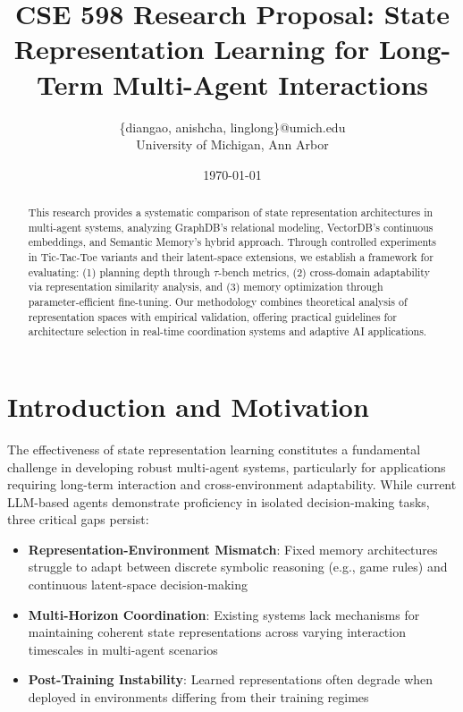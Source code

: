 \documentclass[11pt]{article}
\title{CSE 598 Research Proposal: State Representation Learning for Long-Term Multi-Agent Interactions}
\author{\{diangao, anishcha, linglong\}@umich.edu \\ University of Michigan, Ann Arbor}
\date{\today}
\begin{document}
\maketitle

\begin{abstract}
\noindent This research provides a systematic comparison of state representation architectures in multi-agent systems, analyzing GraphDB's relational modeling, VectorDB's continuous embeddings, and Semantic Memory's hybrid approach. Through controlled experiments in Tic-Tac-Toe variants and their latent-space extensions, we establish a framework for evaluating: (1) planning depth through $\tau$-bench metrics, (2) cross-domain adaptability via representation similarity analysis, and (3) memory optimization through parameter-efficient fine-tuning. Our methodology combines theoretical analysis of representation spaces with empirical validation, offering practical guidelines for architecture selection in real-time coordination systems and adaptive AI applications.
\end{abstract}

\section{Introduction and Motivation}
The effectiveness of state representation learning constitutes a fundamental challenge in developing robust multi-agent systems, particularly for applications requiring long-term interaction and cross-environment adaptability. While current LLM-based agents demonstrate proficiency in isolated decision-making tasks, three critical gaps persist:

\begin{itemize}
    \item \textbf{Representation-Environment Mismatch}: Fixed memory architectures struggle to adapt between discrete symbolic reasoning (e.g., game rules) and continuous latent-space decision-making
    
    \item \textbf{Multi-Horizon Coordination}: Existing systems lack mechanisms for maintaining coherent state representations across varying interaction timescales in multi-agent scenarios
    
    \item \textbf{Post-Training Instability}: Learned representations often degrade when deployed in environments differing from their training regimes
\end{itemize}
\end{document}
